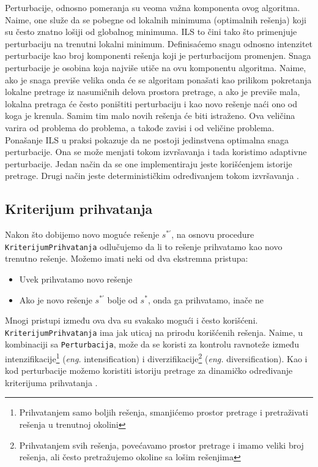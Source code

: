 \documentclass[a4paper]{article}
\newcommand{\sstar}[0]{$\textit{s}^*$}
\newcommand{\eng}[1]{(\textit{eng.} #1)}
\newcommand{\kriterijum}[0]{\small{\texttt{KriterijumPrihvatanja}}}
\newcommand{\perturbacija}[0]{\small{\texttt{Perturbacija}}}
\begin{document}
Perturbacije, odnosno pomeranja su veoma važna komponenta ovog algoritma. Naime, one služe da se pobegne od lokalnih minimuma (optimalnih rešenja) koji su često 
znatno lošiji od globalnog minimuma. ILS to čini tako što primenjuje perturbaciju na trenutni lokalni minimum. Definisaćemo snagu odnosno intenzitet perturbacije 
kao broj komponenti rešenja koji je perturbacijom promenjen. Snaga perturbacije je osobina koja najviše utiče na ovu komponentu algoritma. Naime, ako je snaga previše velika 
onda će se algoritam ponašati kao prilikom pokretanja lokalne pretrage iz nasumičnih delova prostora pretrage, a ako je previše mala, lokalna pretraga će često 
poništiti perturbaciju i kao novo rešenje 
naći ono od koga je krenula. Samim tim malo novih rešenja će biti istraženo. Ova veličina varira od problema do problema, a takođe zavisi i od veličine problema. 
Ponašanje ILS u praksi pokazuje da ne postoji jedinstvena optimalna snaga perturbacije. Ona se može menjati tokom izvršavanja i tada koristimo adaptivne perturbacije. 
Jedan način da se one implementiraju jeste korišćenjem istorije pretrage. Drugi način jeste determinističkim određivanjem tokom izvršavanja \cite{handbookOfMetaheuristics, beginnersIntroduction}.

\subsection{Kriterijum prihvatanja}

Nakon što dobijemo novo moguće rešenje $\textit{s}^{*\prime}$, na osnovu procedure \kriterijum{} odlučujemo da li to rešenje prihvatamo kao novo trenutno rešenje. 
Možemo imati neki od dva ekstremna pristupa:
\begin{itemize}
  \item Uvek prihvatamo novo rešenje
  \item Ako je novo rešenje $\textit{s}^{*\prime}$ bolje od \sstar{}, onda ga prihvatamo, inače ne
\end{itemize}
Mnogi pristupi između ova dva su svakako mogući i često korišćeni. \\
\kriterijum{} ima jak uticaj na prirodu korišćenih rešenja. Naime, u kombinaciji sa \perturbacija{}, može da se 
koristi za kontrolu ravnoteže između intenzifikacije\footnote{Prihvatanjem samo boljih rešenja, smanjićemo prostor pretrage i pretraživati rešenja u trenutnoj okolini} \eng{intensification} 
i diverzifikacije\footnote{Prihvatanjem svih rešenja, povećavamo prostor pretrage i imamo veliki broj rešenja, ali često pretražujemo okoline sa lošim rešenjima} \eng{diversification}. Kao i kod perturbacije 
možemo koristiti istoriju pretrage za dinamičko određivanje kriterijuma prihvatanja \cite{handbookOfMetaheuristics, beginnersIntroduction}. 
\end{document}
